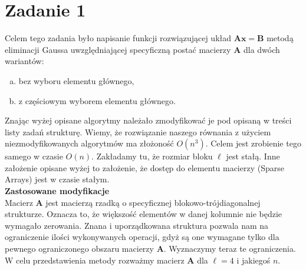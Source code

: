 \documentclass[]{article}
\newcommand{\mA}{\bm{A}}
\newcommand{\mB}{\bm{B}}
\newcommand{\vx}{\bm{x}}
\begin{document}
	\section*{Zadanie 1}
	
	Celem tego zadania było napisanie funkcji rozwiązującej układ $\mA\vx = \mB$ metodą eliminacji Gaussa uwzględniającej specyficzną postać macierzy $\mA$ dla dwóch wariantów:
	\begin{enumerate}[a)]
		\item bez wyboru elementu głównego,
		\item z częściowym wyborem elementu głównego.
	\end{enumerate}

	Znając wyżej opisane algorytmy należało zmodyfikować je pod opisaną w treści listy zadań strukturę. Wiemy, że rozwiązanie naszego równania z użyciem niezmodyfikowanych algorytmów ma złożoność $O(n^3)$. Celem jest zrobienie tego samego w czasie $O(n)$. Zakładamy tu, że rozmiar bloku $\ell$ jest stałą. Inne założenie opisane wyżej to założenie, że dostęp do elementu macierzy (Sparse Arrays) jest w czasie stałym.\\
	\textbf{Zastosowane modyfikacje}\\
	Macierz $\mA$ jest macierzą rzadką o specyficznej blokowo-trójdiagonalnej strukturze. Oznacza to, że większość elementów w danej kolumnie nie będzie wymagało zerowania. Znana i uporządkowana struktura pozwala nam na ograniczenie ilości wykonywanych operacji, gdyż są one wymagane tylko dla pewnego ograniczonego obszaru macierzy $\mA$. Wyznaczymy teraz te ograniczenia. W celu przedstawienia metody rozważmy macierz $\mA$ dla $\ell = 4$ i jakiegoś $n$.
\end{document}
